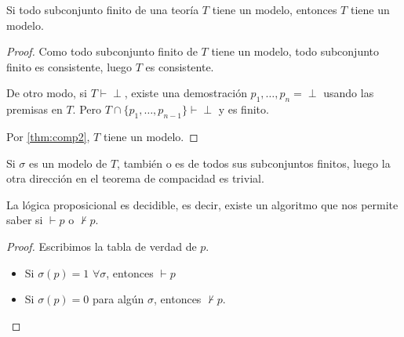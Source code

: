 \begin{theorem}
	Si todo subconjunto finito de una teoría $T$ tiene un modelo, entonces $T$ tiene un modelo.
\end{theorem}
\begin{proof}
	Como todo subconjunto finito de $T$ tiene un modelo, todo subconjunto finito es consistente, luego $T$ es consistente. 
	
	De otro modo, si $T\vdash \perp$, existe una demostración $p_1, \hdots, p_n = \perp$ usando las premisas en $T$. Pero $T\cap\{p_1,\hdots,p_{n-1}\}\vdash \perp$ y es finito.
	
	Por \ref{thm:comp2}, $T$ tiene un modelo.
\end{proof}

\begin{obs}
	Si $\sigma$ es un modelo de $T$, también o es de todos sus subconjuntos finitos, luego la otra dirección en el teorema de compacidad es trivial.
\end{obs}

\begin{theorem}
	La lógica proposicional es decidible, es decir, existe un algoritmo que nos permite saber si $\vdash p$ o $\nvdash p$.
\end{theorem}
\begin{proof}
	Escribimos la tabla de verdad de $p$.
	\begin{itemize}
		\item Si $\sigma(p) = 1$ $\forall\sigma$, entonces $\vdash p$
		\item Si $\sigma(p) = 0$ para algún $\sigma$, entonces $\nvdash p$.
	\end{itemize}
\end{proof}
